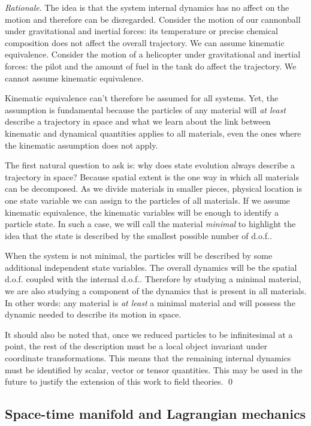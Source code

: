 \documentclass[aps,pra,10pt,twocolumn,floatfix,nofootinbib]{revtex4-1}
\numberwithin{equation}{section}
\theoremstyle{definition}
\newenvironment{rationale}{\emph{Rationale}.}{\qed}
\begin{document}
\begin{rationale}
	The idea is that the system internal dynamics has no affect on the motion and therefore can be disregarded. Consider the motion of our cannonball under gravitational and inertial forces: its temperature or precise chemical composition does not affect the overall trajectory. We can assume kinematic equivalence. Consider the motion of a helicopter under gravitational and inertial forces: the pilot and the amount of fuel in the tank do affect the trajectory. We cannot assume kinematic equivalence.
	
	Kinematic equivalence can't therefore be assumed for all systems. Yet, the assumption is fundamental because the particles of any material will \emph{at least} describe a trajectory in space and what we learn about the link between kinematic and dynamical quantities applies to all materials, even the ones where the kinematic assumption does not apply.
	
	The first natural question to ask is: why does state evolution always describe a trajectory in space? Because spatial extent is the one way in which all materials can be decomposed. As we divide materials in smaller pieces, physical location is one state variable we can assign to the particles of all materials. If we assume kinematic equivalence, the kinematic variables will be enough to identify a particle state. In such a case, we will call the material \emph{minimal} to highlight the idea that the state is described by the smallest possible number of d.o.f..
	
	When the system is not minimal, the particles will be described by some additional independent state variables. The overall dynamics will be the spatial d.o.f. coupled with the internal d.o.f.. Therefore by studying a minimal material, we are also studying a component of the dynamics that is present in all materials. In other words: any material is \emph{at least} a minimal material and will possess the dynamic needed to describe its motion in space.
	
	It should also be noted that, once we reduced particles to be infinitesimal at a point, the rest of the description must be a local object invariant under coordinate transformations. This means that the remaining internal dynamics must be identified by scalar, vector or tensor quantities. This may be used in the future to justify the extension of this work to field theories. 
\end{rationale}


\subsection{Space-time manifold and Lagrangian mechanics}
\end{document}
